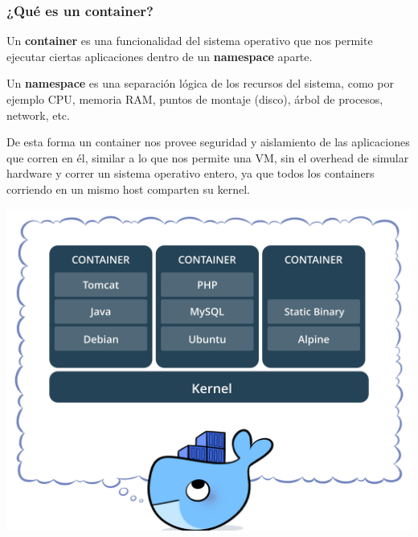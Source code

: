 \documentclass[xcolor={dvipsnames}]{beamer}
\begin{document}
\begin{frame}[fragile]
	\frametitle{¿Qué es un container?}
	\vspace{-0.8cm}
	\begin{multicols}{2}
	\justify
			\begin{spacing}{0.8}
		\small Un \textbf{container} es una funcionalidad del sistema operativo que nos permite ejecutar ciertas aplicaciones dentro de un \textbf{namespace} aparte.

		\vspace{0.25cm}

		\small Un \textbf{namespace} es una separación lógica de los recursos del sistema, como por ejemplo CPU, memoria RAM, puntos de montaje (disco), árbol de procesos, network, etc.

		\vspace{0.25cm}

		\small De esta forma un container nos provee seguridad y aislamiento de las aplicaciones que corren en él, similar a lo que nos permite una VM, sin el overhead de simular hardware y correr un sistema operativo entero, ya que todos los containers corriendo en un mismo host comparten su kernel.
			\end{spacing}
	\columnbreak
	\vspace*{\fill}
		\includegraphics[height=.6\textheight]{assets/containerz.png}
	\vspace*{\fill}
	\end{multicols}
\end{frame}
\end{document}
